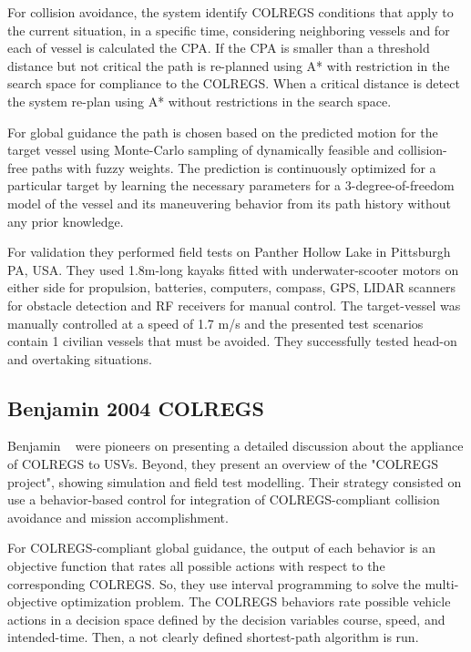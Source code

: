     For collision avoidance, the system identify COLREGS conditions that apply to the current situation, in a specific time, considering neighboring vessels and for each of vessel is calculated the \ac{CPA}. If the \ac{CPA} is smaller than a threshold distance but not critical the path is re-planned using A* with restriction in the search space for compliance to the COLREGS.  When a critical distance is detect the system re-plan using A* without restrictions in the search space. 
    
    For global guidance the path is chosen based on the predicted motion for the target vessel using Monte-Carlo sampling of dynamically feasible and collision-free paths with fuzzy weights. The prediction is continuously optimized for a particular target by learning the necessary parameters for a 3-degree-of-freedom model of the vessel and its maneuvering behavior from its path history without any prior knowledge.
    
    For validation they performed field tests on Panther Hollow Lake in Pittsburgh PA, USA. They used 1.8m-long kayaks fitted with underwater-scooter motors on either side for propulsion, batteries, computers, compass, GPS, LIDAR scanners for obstacle detection and RF receivers for manual control. The target-vessel was manually controlled at a speed of 1.7 m/s and the presented test scenarios contain 1 civilian vessels that must be avoided. They successfully tested head-on and overtaking situations.
    
    \subsection{Benjamin 2004 COLREGS}
    Benjamin \etal~\cite{Benjamin2004COLREGS} were pioneers on presenting a detailed discussion about the appliance of COLREGS to USVs. Beyond, they present an overview of the "COLREGS project", showing simulation and field test modelling. Their strategy consisted on use a behavior-based control for integration of COLREGS-compliant collision avoidance and mission accomplishment.
    
    For COLREGS-compliant global guidance, the output of each behavior is an objective function that rates all possible actions with respect to the corresponding COLREGS. So, they use interval programming to solve the multi-objective optimization problem. The COLREGS behaviors rate possible vehicle actions in a decision space defined by the decision variables course, speed, and intended-time. Then, a not clearly defined shortest-path algorithm is run.
    
